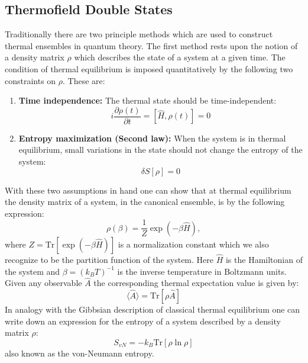 \documentclass[twocolumn,draft,aps,nofootinbib,nobibnotes,final]{revtex4-2}
\newcommand{\expect}[1]{\langle #1\rangle}
\newcommand{\Tr}{\mathrm{Tr}}
\begin{document}
\subsection{Thermofield Double States}\label{sec:tfd-state}

Traditionally there are two principle methods \cite{Khanna2009Thermal} which are used to construct thermal ensembles in quantum theory. The first method rests upon the notion of a density matrix $ \rho $ which describes the state of a system at a given time. The condition of thermal equilibrium is imposed quantitatively by the following two constraints on $ \rho $. These are:
\begin{enumerate}[label=\emph{\alph*})]
	\item \textbf{Time independence:} The thermal state should be time-independent:
	\begin{equation}\label{eqn:thermal-condition-1}
		i\frac{\partial \rho(t)}{\partial t} = [\hat H, \rho(t)] = 0
	\end{equation}
	\item \textbf{Entropy maximization (Second law):} When the system is in thermal equilibrium, small variations in the state should not change the entropy of the system:
	\begin{equation}\label{eqn:entropy-maximization}
		\delta S[\rho] = 0
	\end{equation}
\end{enumerate}
With these two assumptions in hand one can show \cite{Khanna2009Thermal} that at thermal equilibrium the density matrix of a system, in the canonical ensemble, is by the following expression:
\begin{equation}\label{eqn:thermal-density-matrix}
	\rho(\beta) =  \frac{1}{Z}\exp{(-\beta \hat H)},
\end{equation}
where $ Z = \Tr[\exp(-\beta \hat H)] $ is a normalization constant which we also recognize to be the partition function of the system. Here $ \hat H $ is the Hamiltonian of the system and $ \beta = (k_B T)^{-1} $ is the inverse temperature in Boltzmann units. Given any observable $ \hat A $ the corresponding thermal expectation value is given by:
\begin{equation}\label{eqn:thermal-expectation-value-1}
	\expect{\hat A} = \Tr[ \rho \hat A]
\end{equation}
In analogy with the Gibbsian description of classical thermal equilibrium one can write down an expression for the entropy of a system described by a density matrix $ \rho $:
\begin{equation}\label{eqn:von-neumann-entropy}
	S_{vN} = - k_B \Tr[\rho \ln \rho]
\end{equation}
also known as the von-Neumann entropy.
\end{document}

